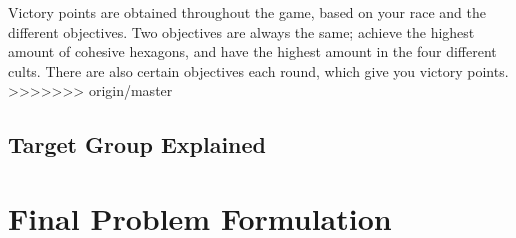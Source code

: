 Victory points are obtained throughout the game, based on your race and the different objectives. Two objectives are always the same; achieve the highest amount of cohesive hexagons, and have the highest amount in the four different cults. There are also certain objectives each round, which give you victory points. 
>>>>>>> origin/master

\subsection{Target Group Explained}

\section{Final Problem Formulation}\label{sec:finalprob}

